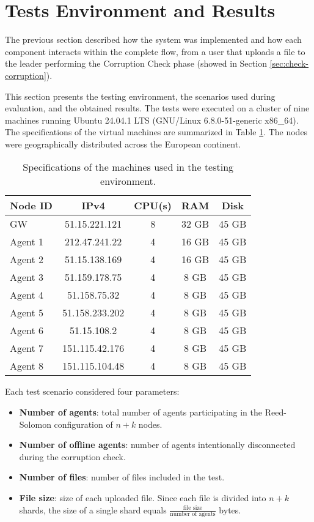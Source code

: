 \section{Tests Environment and Results}

The previous section described how the system was implemented and how each
component interacts within the complete flow, from a user that uploads a file to
the leader performing the Corruption Check phase (showed in Section
\ref{sec:check-corruption}).

This section presents the testing environment, the scenarios used during evaluation, and the obtained results. The tests were executed on a cluster of nine machines running Ubuntu 24.04.1 LTS (GNU/Linux 6.8.0-51-generic x86\_64). The specifications of the virtual machines are summarized in Table \ref{tab:vms-specs}. The nodes were geographically distributed across the European continent.

\begin{table}[h!]
    \centering
    \begin{tabular}{|l|c|c|c|c|}
    \hline
       \textbf{Node ID} & \textbf{IPv4} & \textbf{CPU(s)} & \textbf{RAM} & \textbf{Disk} \\
       \hline
        GW & 51.15.221.121 & 8 & 32 GB & 45 GB \\
        Agent 1 & 212.47.241.22 & 4 & 16 GB & 45 GB \\
        Agent 2 & 51.15.138.169 & 4 & 16 GB & 45 GB \\
        Agent 3 & 51.159.178.75 & 4 & 8 GB & 45 GB \\
        Agent 4 & 51.158.75.32 & 4 & 8 GB & 45 GB \\
        Agent 5 & 51.158.233.202 & 4 & 8 GB & 45 GB \\
        Agent 6 & 51.15.108.2 & 4 & 8 GB & 45 GB \\
        Agent 7 & 151.115.42.176 & 4 & 8 GB & 45 GB \\
        Agent 8 & 151.115.104.48 & 4 & 8 GB & 45 GB \\
        \hline
    \end{tabular}
    \caption{Specifications of the machines used in the testing environment.}
    \label{tab:vms-specs}
\end{table}

Each test scenario considered four parameters:
\begin{itemize}
    \item \textbf{Number of agents}: total number of agents participating in the Reed-Solomon configuration of $n + k$ nodes.
    \item \textbf{Number of offline agents}: number of agents intentionally
        disconnected during the corruption check.
    \item \textbf{Number of files}: number of files included in the test.
    \item \textbf{File size}: size of each uploaded file. Since each file is divided into $n + k$ shards, the size of a single shard equals $\frac{\text{file size}}{\text{number of agents}}$ bytes.
\end{itemize}

